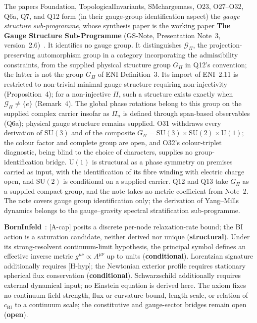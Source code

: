 \documentclass[11pt,a4paper]{article}
\newcommand{\SU}{\mathrm{SU}}
\newcommand{\sstruct}{\textcolor{cstruct}{\textbf{structural}}}
\newcommand{\sopen}{\textcolor{copen}{\textbf{open}}}
\newcommand{\scond}{\textcolor{ccond}{\textbf{conditional}}}
\begin{document}
    The papers Foundation, TopologicalInvariants, SMchargemass, O23, O27--O32, Q6a, Q7, and Q12
    form (in their gauge-group identification aspect) the \emph{gauge structure sub-programme},
    whose synthesis paper is the working paper \textbf{The Gauge Structure Sub-Programme}
    (GS-Note, Presentation Note~3, version~2.6)~\cite{Beau2026gsnote}.
    It identifies no gauge group.
    It distinguishes $\mathcal{G}_\Pi$, the projection-preserving automorphism group in a category
    incorporating the admissibility constraints, from the supplied physical structure group $G_\Pi$
    in Q12's convention; the latter is not the group $G_\Pi$ of ENI Definition~3.
    Its import of ENI~2.11 is restricted to non-trivial minimal gauge structure requiring non-injectivity
    (Proposition~4); for a non-injective $\Pi$, such a structure exists exactly when
    $\mathcal{G}_\Pi \neq \{e\}$ (Remark~4).
    The global phase rotations belong to this group on the supplied complex carrier insofar as $\Pi_n$
    is defined through span-based observables (Q6a); physical gauge structure remains supplied.
    O31 withdraws every derivation of $\SU(3)$ and of the composite
    $G_\Pi = \SU(3) \times \SU(2) \times \mathrm{U}(1)$; the colour factor and complete group are
    open, and O32's colour-triplet diagnostic, being blind to the choice of characters, supplies no
    group-identification bridge.
    $\mathrm{U}(1)$ is structural as a phase symmetry on premises carried as input, with the
    identification of its fibre winding with electric charge open, and $\SU(2)$ is conditional on a
    supplied carrier.
    Q12 and Q13 take $G_\Pi$ as a supplied compact group, and the note takes no metric coefficient
    from Note~2. The note covers gauge group identification only; the
    derivation of Yang--Mills dynamics belongs to the gauge--gravity spectral stratification
    sub-programme.

    \textbf{BornInfeld}~\cite{Beau2026c}: [A-cap] posits a discrete per-node relaxation-rate bound;
    the BI action is a saturation candidate, neither derived nor unique (\sstruct).
    Under its strong-resolvent continuum-limit hypothesis, the principal symbol defines an effective inverse
    metric $g^{\mu\nu}\propto A^{\mu\nu}$ up to units (\scond).
    Lorentzian signature additionally requires [H-hyp]; the Newtonian exterior profile requires
    stationary spherical flux conservation (\scond).
    Schwarzschild additionally requires external dynamical input; no Einstein equation is derived here.
    The axiom fixes no continuum field-strength, flux or curvature bound, length scale, or relation of
    $c_{\mathrm{BI}}$ to a continuum scale; the constitutive and gauge-sector bridges remain open (\sopen).
\end{document}

